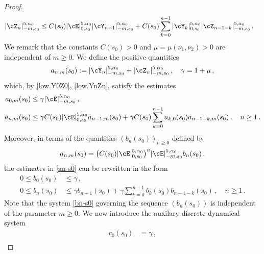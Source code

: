 \documentclass[a4paper,reqno,10pt]{article}
\begin{document}
\begin{proof}
\begin{align}
	|\cZ_{n}|_{-m,s_0}^{5,\alpha_{0}} & \leq C(s_0)  |\cE|_{0,s_0}^{5,\alpha_{0}}   |\cY_{n-1}|_{-m,s_0}^{5,\alpha_{0}}  + C(s_0) \sum_{k=0}^{n-1}  |\cY_{k}|_{0,s_0}^{5,\alpha_{0}}   |\cZ_{n-1-k}|_{-m,s_0}^{5,\alpha_{0}}  \,. \label{low.YnZn} 
   \end{align}
	We remark that the constants $C(s_0)>0$ and $\mu=\mu(\nu_{1},\nu_{2})>0$ are independent of $m\geq 0$. We define the positive quantities
	\begin{equation}\label{an.def.s0}
		a_{n,m}(s_0) := 	|\cY_{n}|_{-m,s_0}^{5,\alpha_{0}}  + 	|\cZ_{n}|_{-m,s_0}^{5,\alpha_{0}} \,, \quad \gamma= 1 + \mu \,,
	\end{equation}
	which, by \eqref{low.Y0Z0}, \eqref{low.YnZn}, satisfy the estimates
	\begin{align}
		a_{0,m}(s_0) & \leq \gamma |\cE|_{-m,s_0}^{5,\alpha_{0}} \,, \\
		a_{n,m}(s_0) &  \leq \gamma C(s_0)  |\cE|_{0,s_0}^{5,\alpha_{0}} a_{n-1,m}(s_0)  + \gamma C(s_0) \sum_{k=0}^{n-1}  a_{k,0}(s_0) a_{n-1-k,m}(s_0) \,, \quad n\geq 1 \,.\label{an-s0}
	\end{align}
	Moreover, in terms of the quantities $(b_{n}(s_0))_{n\geq 0}$ defined by
	\begin{equation}\label{anbn}
		a_{n,m}(s_0) = \big( C(s_0) |\cE|_{0,s_0}^{5,\alpha_{0}} \big)^{n} |\cE|_{-m,s_0}^{5,\alpha_{0}}b_{n}(s_0) \,,
	\end{equation}
	the estimates in \eqref{an-s0} can be rewritten in the form
		\begin{align}
	0\leq 	b_0(s_0) & \leq \gamma  \,, \\
	0\leq 	b_n(s_0) &  \leq \gamma  b_{n-1}(s_0)  + \gamma  \sum_{k=0}^{n-1}  b_{k}(s_0) b_{n-1-k}(s_0) \,, \quad n\geq 1 \,.\label{bn-s0}
	\end{align}
	Note that the system \eqref{bn-s0} governing the sequence $(b_{n}(s_0))$ is independent of the parameter $m\geq 0$.
	We now introduce the auxilary discrete dynamical system
	\begin{align}
		c_0(s_0) &= \gamma \,, \\

\end{align}
\end{proof}
\end{document}
